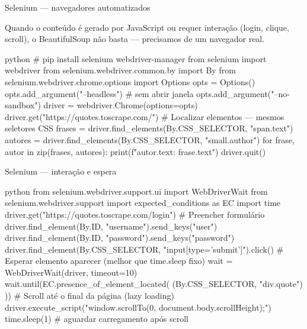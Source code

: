 \documentclass[xcolor=dvipsnames,t,aspectratio=169]{beamer}
\newcommand{\highlight}[1]{{\color{nes_dark_orange} #1}}
\begin{document}
\begin{frame}[c, fragile]{Selenium — navegadores automatizados}

Quando o conteúdo é gerado por \highlight{JavaScript} ou requer interação (login, clique, scroll), o BeautifulSoup não basta — precisamos de um navegador real.

\begin{code}{python}
# pip install selenium webdriver-manager
from selenium import webdriver
from selenium.webdriver.common.by import By
from selenium.webdriver.chrome.options import Options
opts = Options()
opts.add_argument("--headless")          # sem abrir janela
opts.add_argument("--no-sandbox")
driver = webdriver.Chrome(options=opts)
driver.get("https://quotes.toscrape.com/")
# Localizar elementos — mesmos seletores CSS
frases = driver.find_elements(By.CSS_SELECTOR, "span.text")
autores = driver.find_elements(By.CSS_SELECTOR, "small.author")
for frase, autor in zip(frases, autores):
    print(f"{autor.text}: {frase.text}")
driver.quit()
\end{code}

\end{frame}


\begin{frame}[c, fragile]{Selenium — interação e espera}

\begin{code}{python}
from selenium.webdriver.support.ui import WebDriverWait
from selenium.webdriver.support import expected_conditions as EC
import time
driver.get("https://quotes.toscrape.com/login")
# Preencher formulário
driver.find_element(By.ID, "username").send_keys("user")
driver.find_element(By.ID, "password").send_keys("password")
driver.find_element(By.CSS_SELECTOR, "input[type='submit']").click()
# Esperar elemento aparecer (melhor que time.sleep fixo)
wait = WebDriverWait(driver, timeout=10)
wait.until(EC.presence_of_element_located(
    (By.CSS_SELECTOR, "div.quote")
))
# Scroll até o final da página (lazy loading)
driver.execute_script("window.scrollTo(0, document.body.scrollHeight);")
time.sleep(1)  # aguardar carregamento após scroll
\end{code}

\end{frame}
\end{document}
